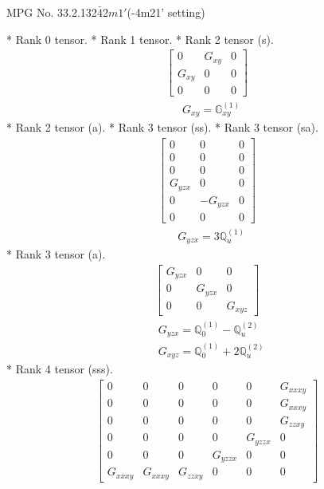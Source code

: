 \documentclass[fleqn,8pt,landscape]{jsarticle}
\begin{document}
\setcounter{MaxMatrixCols}{32}

\renewcommand{\tablename}{Table~}
\renewcommand{\figurename}{Figure~}
\begin{center}
\LARGE
MPG No. 33.2.132\quad$\bar{4}2m1'$\quad(-4m21' setting)
\end{center}
* Rank 0 tensor.
* Rank 1 tensor.
* Rank 2 tensor (s).
\begin{align*}
\begin{bmatrix} 0 & G_{xy} & 0 \\ G_{xy} & 0 & 0 \\ 0 & 0 & 0 \end{bmatrix}
\end{align*}
\begin{align*}
& G_{xy} = \mathbb{G}_{xy}^{(1)}
\end{align*}
* Rank 2 tensor (a).
* Rank 3 tensor (ss).
* Rank 3 tensor (sa).
\begin{align*}
\begin{bmatrix} 0 & 0 & 0 \\ 0 & 0 & 0 \\ 0 & 0 & 0 \\ G_{yzx} & 0 & 0 \\ 0 & - G_{yzx} & 0 \\ 0 & 0 & 0 \end{bmatrix}
\end{align*}
\begin{align*}
& G_{yzx} = 3 \mathbb{Q}_{u}^{(1)}
\end{align*}
* Rank 3 tensor (a).
\begin{align*}
\begin{bmatrix} G_{yzx} & 0 & 0 \\ 0 & G_{yzx} & 0 \\ 0 & 0 & G_{xyz} \end{bmatrix}
\end{align*}
\begin{align*}
& G_{yzx} = \mathbb{Q}_{0}^{(1)} - \mathbb{Q}_{u}^{(2)} \\
& G_{xyz} = \mathbb{Q}_{0}^{(1)} + 2 \mathbb{Q}_{u}^{(2)}
\end{align*}
* Rank 4 tensor (sss).
\begin{align*}
\begin{bmatrix} 0 & 0 & 0 & 0 & 0 & G_{xxxy} \\ 0 & 0 & 0 & 0 & 0 & G_{xxxy} \\ 0 & 0 & 0 & 0 & 0 & G_{zzxy} \\ 0 & 0 & 0 & 0 & G_{yzzx} & 0 \\ 0 & 0 & 0 & G_{yzzx} & 0 & 0 \\ G_{xxxy} & G_{xxxy} & G_{zzxy} & 0 & 0 & 0 \end{bmatrix}
\end{align*}
\end{document}
